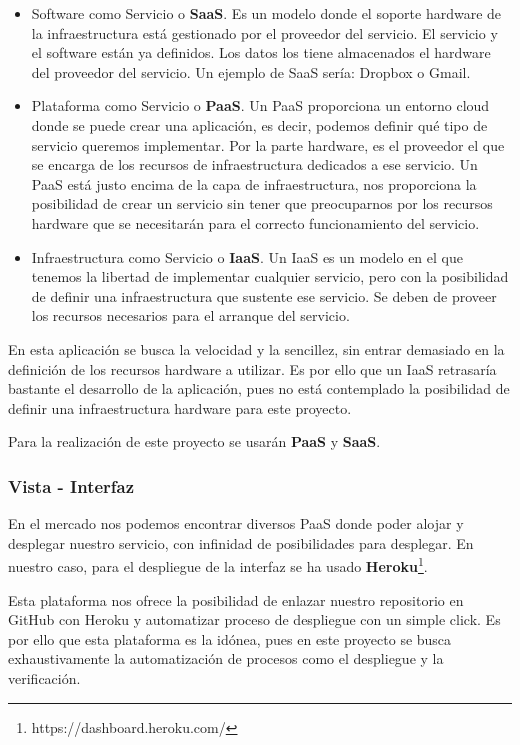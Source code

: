 \begin{itemize}
    \item Software como Servicio o \textbf{SaaS}. Es un modelo donde el soporte hardware de la infraestructura está gestionado por el proveedor del servicio. El servicio y el software están ya definidos. Los datos los tiene almacenados el  hardware del proveedor del servicio. Un ejemplo de SaaS sería: Dropbox o Gmail.
    \item Plataforma como Servicio o \textbf{PaaS}. Un PaaS proporciona un entorno cloud donde se puede crear una aplicación, es decir, podemos definir qué tipo de servicio queremos implementar. Por la parte hardware, es el proveedor el que se encarga de los recursos de infraestructura dedicados a ese servicio. Un PaaS está justo encima de la capa de infraestructura, nos proporciona la posibilidad de crear un servicio sin tener que preocuparnos por los recursos hardware que se necesitarán para el correcto funcionamiento del servicio.
    \item Infraestructura como Servicio o \textbf{IaaS}. Un IaaS es un modelo en el que tenemos la libertad de implementar cualquier servicio, pero con la posibilidad de definir una infraestructura que sustente ese servicio. Se deben de proveer los recursos necesarios para el arranque del servicio.
\end{itemize}

En esta aplicación se busca la velocidad y la sencillez, sin entrar demasiado en la definición de los recursos hardware a utilizar. Es por ello que un IaaS retrasaría bastante el desarrollo de la aplicación, pues no está contemplado la posibilidad de definir una infraestructura hardware para este proyecto.

Para la realización de este proyecto se usarán \textbf{PaaS} y \textbf{SaaS}.

\subsubsection{Vista - Interfaz}

En el mercado nos podemos encontrar diversos PaaS donde poder alojar y desplegar nuestro servicio, con infinidad de posibilidades para desplegar. En nuestro caso, para  el despliegue de la interfaz se ha usado \textbf{Heroku}\footnote{https://dashboard.heroku.com/}.

Esta plataforma nos ofrece la posibilidad de enlazar nuestro repositorio en GitHub con Heroku y automatizar proceso de despliegue con un simple click. Es por ello que esta plataforma es la idónea, pues en este proyecto se busca exhaustivamente la automatización de procesos como el despliegue y la verificación.

